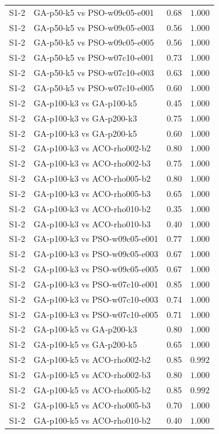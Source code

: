 \begin{tabular}{llrr}
S1-2 & GA-p50-k5 vs PSO-w09c05-e001 & 0.68 & $1.000$ \\
S1-2 & GA-p50-k5 vs PSO-w09c05-e003 & 0.56 & $1.000$ \\
S1-2 & GA-p50-k5 vs PSO-w09c05-e005 & 0.56 & $1.000$ \\
S1-2 & GA-p50-k5 vs PSO-w07c10-e001 & 0.73 & $1.000$ \\
S1-2 & GA-p50-k5 vs PSO-w07c10-e003 & 0.63 & $1.000$ \\
S1-2 & GA-p50-k5 vs PSO-w07c10-e005 & 0.60 & $1.000$ \\
S1-2 & GA-p100-k3 vs GA-p100-k5 & 0.45 & $1.000$ \\
S1-2 & GA-p100-k3 vs GA-p200-k3 & 0.75 & $1.000$ \\
S1-2 & GA-p100-k3 vs GA-p200-k5 & 0.60 & $1.000$ \\
S1-2 & GA-p100-k3 vs ACO-rho002-b2 & 0.80 & $1.000$ \\
S1-2 & GA-p100-k3 vs ACO-rho002-b3 & 0.75 & $1.000$ \\
S1-2 & GA-p100-k3 vs ACO-rho005-b2 & 0.80 & $1.000$ \\
S1-2 & GA-p100-k3 vs ACO-rho005-b3 & 0.65 & $1.000$ \\
S1-2 & GA-p100-k3 vs ACO-rho010-b2 & 0.35 & $1.000$ \\
S1-2 & GA-p100-k3 vs ACO-rho010-b3 & 0.40 & $1.000$ \\
S1-2 & GA-p100-k3 vs PSO-w09c05-e001 & 0.77 & $1.000$ \\
S1-2 & GA-p100-k3 vs PSO-w09c05-e003 & 0.67 & $1.000$ \\
S1-2 & GA-p100-k3 vs PSO-w09c05-e005 & 0.67 & $1.000$ \\
S1-2 & GA-p100-k3 vs PSO-w07c10-e001 & 0.85 & $1.000$ \\
S1-2 & GA-p100-k3 vs PSO-w07c10-e003 & 0.74 & $1.000$ \\
S1-2 & GA-p100-k3 vs PSO-w07c10-e005 & 0.71 & $1.000$ \\
S1-2 & GA-p100-k5 vs GA-p200-k3 & 0.80 & $1.000$ \\
S1-2 & GA-p100-k5 vs GA-p200-k5 & 0.65 & $1.000$ \\
S1-2 & GA-p100-k5 vs ACO-rho002-b2 & 0.85 & $0.992$ \\
S1-2 & GA-p100-k5 vs ACO-rho002-b3 & 0.80 & $1.000$ \\
S1-2 & GA-p100-k5 vs ACO-rho005-b2 & 0.85 & $0.992$ \\
S1-2 & GA-p100-k5 vs ACO-rho005-b3 & 0.70 & $1.000$ \\
S1-2 & GA-p100-k5 vs ACO-rho010-b2 & 0.40 & $1.000$ \\

\end{tabular}
